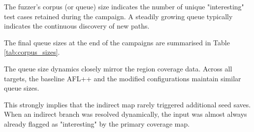 The fuzzer's corpus (or queue) size indicates the number of unique "interesting" test cases retained during the campaign. A steadily growing queue typically indicates the continuous discovery of new paths.

The final queue sizes at the end of the campaigns are summarised in Table \ref{tab:corpus_sizes}.



The queue size dynamics closely mirror the region coverage data. Across all targets, the baseline AFL++ and the modified configurations maintain similar queue sizes.

This strongly implies that the indirect map rarely triggered additional seed saves. When an indirect branch was resolved dynamically, the input was almost always already flagged as "interesting" by the primary coverage map.